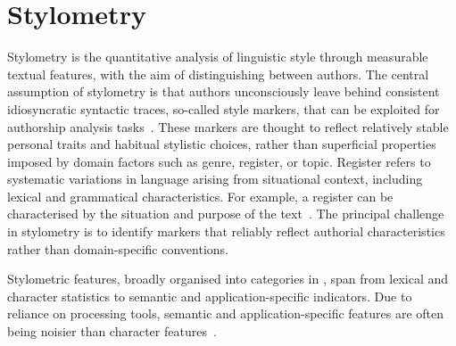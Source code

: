 \section{Stylometry}
\label{sec:stylometry}

Stylometry is the quantitative analysis of linguistic style through measurable textual features, with the aim of distinguishing between authors.
The central assumption of stylometry is that authors unconsciously leave behind consistent idiosyncratic syntactic traces, so-called style markers, that can be exploited for authorship analysis tasks~\citep{neal_surveying_2018}. 
These markers are thought to reflect relatively stable personal traits and habitual stylistic choices, rather than superficial properties imposed by domain factors such as genre, register, or topic.
Register refers to systematic variations in language arising from situational context, including lexical and grammatical characteristics.
For example, a register can be characterised by the situation and purpose of the text~\citep{register_2025,register_2019}. 
The principal challenge in stylometry is to identify markers that reliably reflect authorial characteristics rather than domain-specific conventions.

Stylometric features, broadly organised into categories in , span from lexical and character statistics to semantic and application-specific indicators.
Due to reliance on processing tools, semantic and application-specific features are often being noisier than character features~\citep{stamatatos_survey_2009}.




